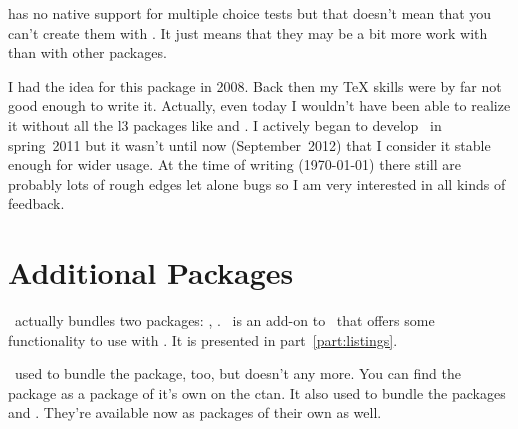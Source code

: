 \documentclass[load-preamble+]{cnltx-doc}
\begin{document}
\ExSheets{} has no native support for multiple choice tests but that doesn't
mean that you can't create them with \ExSheets.  It just means that they may
be a bit more work with \ExSheets{} than with other packages.

I had the idea for this package in 2008.  Back then my \TeX{} skills were by
far not good enough to write it.  Actually, even today I wouldn't have been
able to realize it without all the l3 packages like  and
.  I actively began to develop \ExSheets\ in spring~2011 but
it wasn't until now (September~2012) that I consider it stable enough for
wider usage.  At the time of writing (\today) there still are probably lots of
rough edges let alone bugs so I am very interested in all kinds of feedback.

\section{Additional Packages}
\ExSheets\ actually bundles two packages: \ExSheets, \ExSheetslistings.
\ExSheetslistings\ is an add-on to \ExSheets\ that offers some functionality
to use  with \ExSheets.  It is presented in
part~\ref{part:listings}.

\ExSheets\ used to bundle the  package,
too, but doesn't any more.  You can find the
 package as a package of it's own on the \ac{ctan}.  It also
used to bundle the packages  and
.  They're available now as packages of
their own as well.


\end{document}
